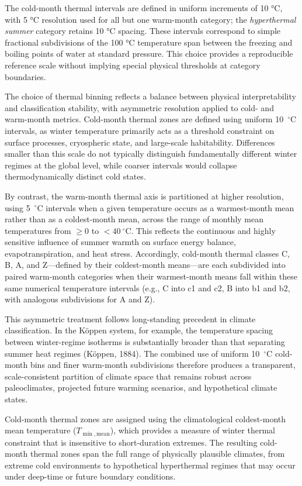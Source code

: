 \documentclass[12pt]{article}
\begin{document}
The cold-month thermal intervals are defined in uniform increments of 10 °C, with 5 °C resolution used for all but one warm-month category; the \textit{hyperthermal summer} category retains 10 °C spacing. These intervals correspond to simple fractional subdivisions of the 100 °C temperature span between the freezing and boiling points of water at standard pressure. This choice provides a reproducible reference scale without implying special physical thresholds at category boundaries.

The choice of thermal binning reflects a balance between physical
interpretability and classification stability, with asymmetric resolution
applied to cold- and warm-month metrics. Cold-month thermal zones are
defined using uniform 10~$^\circ$C intervals, as winter temperature
primarily acts as a threshold constraint on surface processes, cryospheric
state, and large-scale habitability. Differences smaller than this scale do
not typically distinguish fundamentally different winter regimes at the
global level, while coarser intervals would collapse thermodynamically
distinct cold states.

By contrast, the warm-month thermal axis is partitioned at higher resolution, using 5~$^\circ$C intervals when a given temperature occurs as a warmest-month mean rather than as a coldest-month mean, across the range of monthly mean temperatures from $\geq 0$ to $<40~^\circ$C. This reflects the continuous and highly sensitive influence of summer warmth on surface energy balance, evapotranspiration, and heat stress. Accordingly, cold-month thermal classes C, B, A, and Z—defined by their coldest-month means—are each subdivided into paired warm-month categories when their warmest-month means fall within these same numerical temperature intervals (e.g., C into c1 and c2, B into b1 and b2, with analogous subdivisions for A and Z).

This asymmetric treatment follows long-standing precedent in climate classification. In the Köppen system, for example, the temperature spacing between winter-regime isotherms is substantially broader than that separating summer heat regimes (Köppen, 1884). The combined use of uniform 10~$^\circ$C cold-month bins and finer warm-month subdivisions therefore produces a transparent, scale-consistent partition of climate space that remains robust across paleoclimates, projected future warming scenarios, and hypothetical climate states.

Cold-month thermal zones are assigned using the climatological
coldest-month mean temperature ($T_{\min,\mathrm{mean}}$), which provides a measure of winter thermal constraint that is insensitive to short-duration extremes. The resulting cold-month thermal zones span the full
range of physically plausible climates, from extreme cold environments to
hypothetical hyperthermal regimes that may occur under deep-time or future
boundary conditions.
\end{document}
